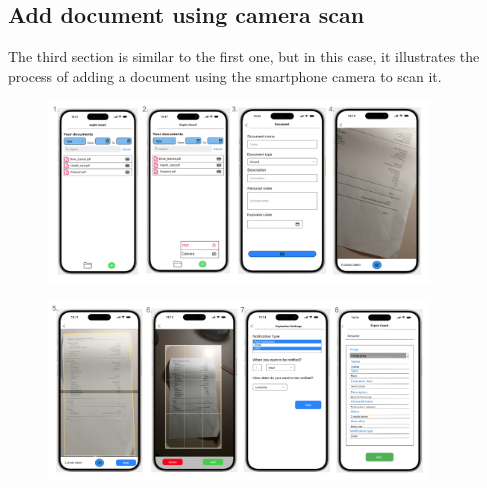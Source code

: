 	\subsection{Add document using camera scan}
		The third section is similar to the first one, but in this case, it illustrates the process of adding a document using the smartphone camera to scan it.
		\begin{figure}[htbp]
			\centering
			\includegraphics[width=0.9\textwidth]{../mockups/add_doc_cam_1.png}  %
		\end{figure}

		\begin{figure}[htbp]
			\centering
			\includegraphics[width=0.9\textwidth]{../mockups/add_doc_cam_2.png}  %
		\end{figure}
		\clearpage
